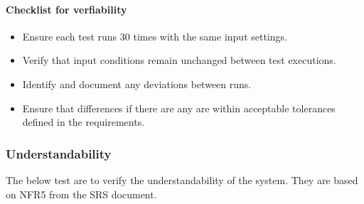 \documentclass[12pt, titlepage]{article}
\begin{document}
\paragraph{\indent Checklist for verfiability}
\begin{itemize}
    \item Ensure each test runs 30 times with the same input settings.
    \item Verify that input conditions remain unchanged between test executions.
    \item Identify and document any deviations between runs.
    \item Ensure that differences if there are any are within acceptable tolerances defined in the requirements.
\end{itemize}

\subsubsection{Understandability}

The below test are to verify the understandability of the system.
They are based on NFR5 from the SRS document.
\end{document}
